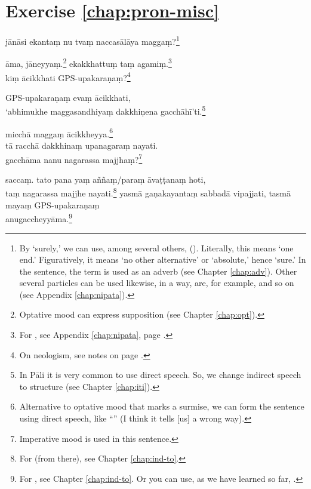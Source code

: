 \section*{Exercise \ref{chap:pron-misc}}
\begin{answerkey}
\item j\=an\=asi ekanta\d m nu tva\d m naccas\=al\=aya magga\d m?\footnote{By `surely,' we can use, among several others,  (). Literally, this means `one end.' Figuratively, it means `no other alternative' or `absolute,' hence `sure.' In the sentence, the term is used as an adverb (see Chapter \ref{chap:adv}). Other several particles can be used likewise, in a way, are, for example,  and so on (see Appendix \ref{chap:nipata}).}
\item \=ama, j\=aneyya\d m.\footnote{Optative mood can express supposition (see Chapter \ref{chap:opt}).} ekakkhattu\d m ta\d m agami\d m.\footnote{For , see Appendix \ref{chap:nipata}, page \pageref{nip:kkhattudm}.} \\ki\d m \=acikkhati GPS-upakara\d na\d m?\footnote{On neologism, see notes on page \pageref{sec:neologism}.}
\item GPS-upakara\d na\d m eva\d m \=acikkhati, \\`abhimukhe maggasandhiya\d m dakkhi\d nena gacch\=ah\=i'ti.\footnote{In P\=ali it is very common to use direct speech. So, we change indirect speech to  structure (see Chapter \ref{chap:iti}).}
\item micch\=a magga\d m \=acikkheyya.\footnote{Alternative to optative mood that marks a surmise, we can form the sentence using direct speech, like ``'' (I think it tells [us] a wrong way).} \\t\=a racch\=a dakkhina\d m upanagara\d m nayati. \\gacch\=ama nanu nagarassa majjha\d m?\footnote{Imperative mood is used in this sentence.}
\item sacca\d m. tato pana ya\d m a\~n\~na\d m/para\d m \=ava\d t\d tana\d m hoti, \\ta\d m nagarassa majjhe nayati.\footnote{For  (from there), see Chapter \ref{chap:ind-to}.} yasm\=a ga\d nakayanta\d m sabbad\=a vipajjati, tasm\=a maya\d m GPS-upakara\d na\d m \\anugaccheyy\=ama.\footnote{For , see Chapter \ref{chap:ind-to}. Or you can use, as we have learned so far, .}

\end{answerkey}

